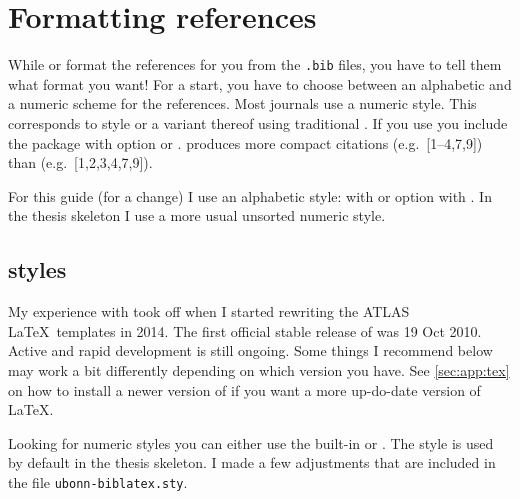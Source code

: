 \section{Formatting references}%
\label{sec:ref:format}

While \BibTeX{} or  format the references for you
from the \texttt{.bib} files, you have to tell them what format you
want!  For a start, you have to choose between an alphabetic and a
numeric scheme for the references. Most journals use a numeric
style. This corresponds to style  or a variant thereof
using traditional \BibTeX.  If you use  you include the
package with option  or
.  produces more compact
citations (e.g.\ [1--4,7,9]) than  (e.g.\ [1,2,3,4,7,9]).

For this guide (for a change) I use an alphabetic style:
 with \BibTeX{} or option  with
. In the thesis skeleton I use a more usual unsorted
numeric style.


\subsection{ styles}%
\label{sec:ref:bbx}

My experience with  took off 
when I started rewriting the ATLAS \LaTeX\ templates in 2014.
The first official stable release of  was 19 Oct 2010.
Active and rapid development is still ongoing.
Some things I recommend below may work a bit differently depending on which version
you have. See \cref{sec:app:tex} on how to install a newer
version of \TeXLive if you want a more up-do-date version of \LaTeX.

Looking for numeric styles you can either use the built-in
 or .
The  style is used by default in the thesis skeleton.
I made a few adjustments that are included in the file
\texttt{ubonn-biblatex.sty}.%


